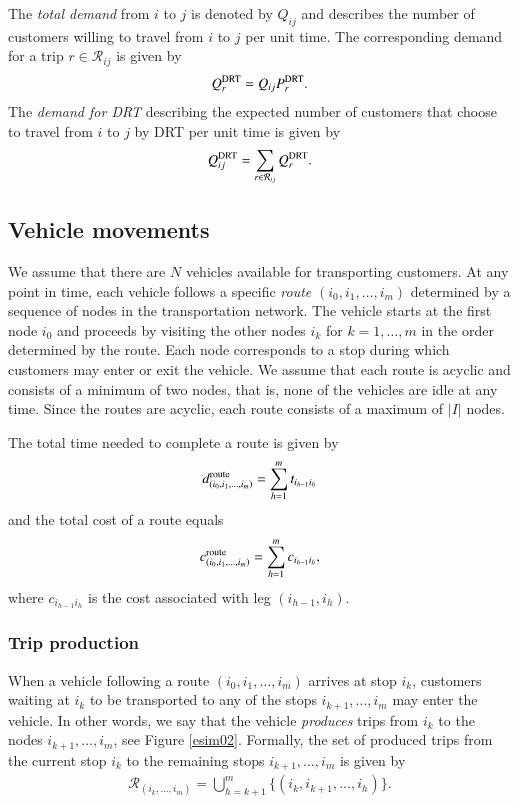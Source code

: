 \documentclass[dissertation,draft*]{aaltoseries}
\begin{document}
The \emph{total demand} from $i$ to $j$ is denoted by $Q_{ij}$ and describes
the number of customers willing to travel from $i$ to $j$ per unit time.
The corresponding demand for a trip $r \in \mathcal{R}_{ij}$ is given by
\begin{align}
\label{matkakysynta}
Q_{r}^{\rm DRT} = Q_{ij} P_{r}^{\rm DRT}.
\end{align}
The \emph{demand for DRT} describing the expected number of customers that 
choose to travel from $i$ to $j$ by DRT per unit time is given by
\begin{align}
\label{drtkysynta}
Q_{ij}^{\rm DRT} = \sum_{r\in \mathcal{R}_{ij}} Q_{r}^{\rm DRT}.
\end{align}

\subsection{Vehicle movements}
\label{vehiclemovements}
We assume that there are $N$ vehicles available for transporting customers. 
At any point in time, each vehicle follows a specific \emph{route} $(i_0,i_1,\ldots,i_m)$ 
determined by a sequence of nodes in the transportation network.
The vehicle starts at the first node $i_0$ and proceeds by visiting the other nodes $i_k$
for $k=1,\ldots,m$ in the order determined by the route.
Each node corresponds to a stop during which customers may enter or exit the vehicle.
We assume that each route is acyclic and consists of a minimum of two nodes, that is, none of the
vehicles are idle at any time. Since the routes are acyclic, each route consists of
a maximum of $|I|$ nodes.

The total time needed to complete a route is given by 
\begin{align}
\label{totaltime}
d_{(i_0,i_1,\ldots,i_m)}^{\rm route} = \sum_{h=1}^m t_{i_{h-1} i_h}
\end{align}
and the total cost of a route equals 
\begin{align}
\label{totalcost}
c_{(i_0,i_1,\ldots,i_m)}^{\rm route} = \sum_{h=1}^m c_{i_{h-1} i_h},
\end{align}
where $c_{i_{h-1}i_h}$ is the cost associated with leg $(i_{h-1},i_h)$.


\subsubsection{Trip production}
When a vehicle following a route $(i_0,i_1,\ldots,i_m)$ arrives at stop $i_k$, customers waiting at $i_k$ to
be transported to any of the stops $i_{k+1},\ldots,i_m$ may enter the vehicle.
In other words, we say that the vehicle \emph{produces} trips from $i_k$ to the nodes $i_{k+1},\ldots,i_m$, see Figure \ref{esim02}.
Formally, the set of produced trips from the current stop $i_k$ to the remaining stops $i_{k+1},\ldots,i_m$ is given by
\begin{align}
\label{tripproduction}
\mathcal{R}_{(i_k,\ldots, i_m)} = \bigcup_{h =k+1}^m \{(i_k,i_{k+1},\ldots,i_h)\}.  
\end{align}
\end{document}
